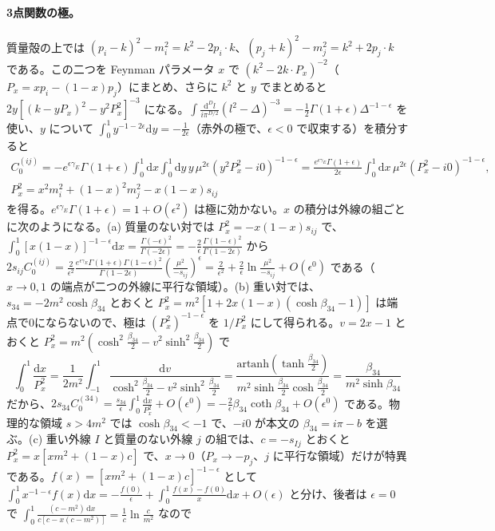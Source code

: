 \documentclass[a4paper,10pt]{ltjsarticle}
\newcommand{\dd}{\mathrm{d}}
\begin{document}
\paragraph{3点関数の極。}質量殻の上では $(p_i-k)^2-m_i^2=k^2-2p_i\cdot k$、$(p_j+k)^2-m_j^2=k^2+2p_j\cdot k$ である。この二つを Feynman パラメータ $x$ で $(k^2-2k\cdot P_x)^{-2}$（$P_x=xp_i-(1-x)p_j$）にまとめ、さらに $k^2$ と $y$ でまとめると $2y[(k-yP_x)^2-y^2P_x^2]^{-3}$ になる。$\int\frac{\dd^Dl}{i\pi^{D/2}}(l^2-\Delta)^{-3}=-\frac12\Gamma(1+\epsilon)\Delta^{-1-\epsilon}$ を使い、$y$ について $\int_0^1y^{-1-2\epsilon}\dd y=-\frac1{2\epsilon}$（赤外の極で、$\epsilon<0$ で収束する）を積分すると
\begin{equation*}
\begin{gathered}
C_0^{(ij)}=-e^{\epsilon\gamma_E}\Gamma(1+\epsilon)\int_0^1\!\dd x\!\int_0^1\!\dd y\,y\,\mu^{2\epsilon}(y^2P_x^2-i0)^{-1-\epsilon}
=\frac{e^{\epsilon\gamma_E}\Gamma(1+\epsilon)}{2\epsilon}\int_0^1\!\dd x\,\mu^{2\epsilon}(P_x^2-i0)^{-1-\epsilon},\\
P_x^2=x^2m_i^2+(1-x)^2m_j^2-x(1-x)s_{ij}
\end{gathered}
\end{equation*}
を得る。$e^{\epsilon\gamma_E}\Gamma(1+\epsilon)=1+O(\epsilon^2)$ は極に効かない。$x$ の積分は外線の組ごとに次のようになる。(a) 質量のない対では $P_x^2=-x(1-x)s_{ij}$ で、$\int_0^1[x(1-x)]^{-1-\epsilon}\dd x=\frac{\Gamma(-\epsilon)^2}{\Gamma(-2\epsilon)}=-\frac2\epsilon\frac{\Gamma(1-\epsilon)^2}{\Gamma(1-2\epsilon)}$ から $2s_{ij}C_0^{(ij)}=\frac2{\epsilon^2}\frac{e^{\epsilon\gamma_E}\Gamma(1+\epsilon)\Gamma(1-\epsilon)^2}{\Gamma(1-2\epsilon)}(\frac{\mu^2}{-s_{ij}})^\epsilon=\frac2{\epsilon^2}+\frac2\epsilon\ln\frac{\mu^2}{-s_{ij}}+O(\epsilon^0)$ である（$x\to0,1$ の端点が二つの外線に平行な領域）。(b) 重い対では、$s_{34}=-2m^2\cosh\beta_{34}$ とおくと $P_x^2=m^2[1+2x(1-x)(\cosh\beta_{34}-1)]$ は端点で0にならないので、極は $(P_x^2)^{-1-\epsilon}$ を $1/P_x^2$ にして得られる。$v=2x-1$ とおくと $P_x^2=m^2(\cosh^2\frac{\beta_{34}}2-v^2\sinh^2\frac{\beta_{34}}2)$ で
\begin{equation*}
\int_0^1\frac{\dd x}{P_x^2}=\frac{1}{2m^2}\int_{-1}^1\frac{\dd v}{\cosh^2\frac{\beta_{34}}2-v^2\sinh^2\frac{\beta_{34}}2}
=\frac{\mathrm{artanh}(\tanh\frac{\beta_{34}}2)}{m^2\sinh\frac{\beta_{34}}2\cosh\frac{\beta_{34}}2}=\frac{\beta_{34}}{m^2\sinh\beta_{34}}
\end{equation*}
だから、$2s_{34}C_0^{(34)}=\frac{s_{34}}\epsilon\int_0^1\frac{\dd x}{P_x^2}+O(\epsilon^0)=-\frac2\epsilon\beta_{34}\coth\beta_{34}+O(\epsilon^0)$ である。物理的な領域 $s>4m^2$ では $\cosh\beta_{34}<-1$ で、$-i0$ が本文の $\beta_{34}=i\pi-b$ を選ぶ。(c) 重い外線 $I$ と質量のない外線 $j$ の組では、$c=-s_{Ij}$ とおくと $P_x^2=x[xm^2+(1-x)c]$ で、$x\to0$（$P_x\to-p_j$、$j$ に平行な領域）だけが特異である。$f(x)=[xm^2+(1-x)c]^{-1-\epsilon}$ として $\int_0^1x^{-1-\epsilon}f(x)\dd x=-\frac{f(0)}\epsilon+\int_0^1\frac{f(x)-f(0)}x\dd x+O(\epsilon)$ と分け、後者は $\epsilon=0$ で $\int_0^1\frac{(c-m^2)\,\dd x}{c[c-x(c-m^2)]}=\frac1c\ln\frac c{m^2}$ なので
\end{document}
